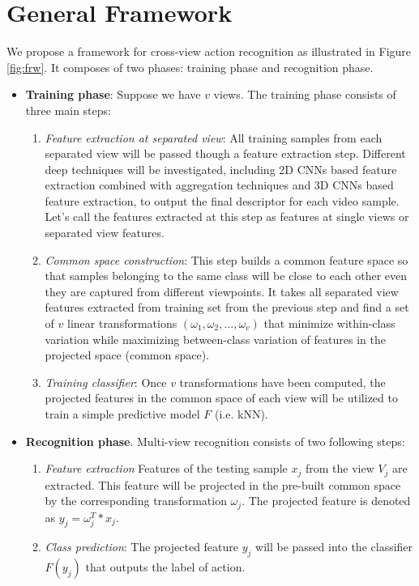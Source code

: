 
\section{General Framework} \label{sec:general_framework}
    We propose a framework for cross-view action recognition as illustrated in Figure \ref{fig:frw}. It composes of two phases: training phase and recognition phase. 
    \begin{itemize}
        \item \textbf{Training phase}: Suppose we have $v$ views. The training phase consists of three main steps: 
        \begin{enumerate}
            \item \textit{Feature extraction at separated view}: All training samples from each separated view will be passed though a feature extraction step. Different deep techniques will be investigated, including 2D CNNs based feature extraction combined with aggregation techniques and 3D CNNs based feature extraction, to output the final descriptor for each video sample. Let's call the features extracted at this step as features at single views or separated view features. 
            \item \textit{Common space construction}: This step builds a common feature space so that samples belonging to the same class will be close to each other even they are captured from different viewpoints. It takes all separated view features extracted from training set from the previous step and find a set of $v$ linear transformations $({\omega}_1, {\omega}_2, ..., {\omega}_v)$ that minimize within-class variation while maximizing between-class variation of features in the projected space (common space). 
            \item \textit{Training classifier}: Once $v$ transformations have been computed, the projected features in the common space of each view will be utilized to train a simple predictive model $F$ (i.e. kNN).
        \end{enumerate}
        \item \textbf{Recognition phase}. Multi-view recognition consists of two following steps:
        \begin{enumerate}
            \item \textit{Feature extraction} Features of the testing sample $x_j$ from the view $V_j$ are extracted. This feature will be projected in the pre-built common space by the corresponding transformation ${\omega}_j$. The projected feature is denoted as $y_j = {\omega}^T_j*x_j$.
            \item \textit{Class prediction}: The projected feature $y_j$ will be passed into the classifier $F(y_j)$ that outputs the label of action.
        \end{enumerate}
    \end{itemize}

